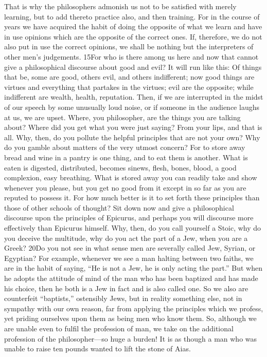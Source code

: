 That is why the philosophers admonish us not to be satisfied with merely learning, but to add thereto practice also, and then training. For in the course of years we have acquired the habit of doing the opposite of what we learn and have in use opinions which are the opposite of the correct ones. If, therefore, we do not also put in use the correct opinions, we shall be nothing but the interpreters of other men's judgements. 15For who is there among us here and now that cannot give a philosophical discourse about good and evil? It will run like this: Of things that be, some are good, others evil, and others indifferent; now good things are virtues and everything that partakes in the virtues; evil are the opposite; while indifferent are wealth, health, reputation. Then, if we are interrupted in the midst of our speech by some unusually loud noise, or if someone in the audience laughs at us, we are upset. Where, you philosopher, are the things you are talking about? Where did you get what you were just saying? From your lips, and that is all. Why, then, do you pollute the helpful principles that are not your own? Why do you gamble about matters of the very utmost concern? For to store away bread and wine in a pantry is one thing, and to eat them is another. What is eaten is digested, distributed, becomes sinews, flesh, bones, blood, a good complexion, easy breathing. What is stored away you can readily take and show whenever you please, but you get no good from it except in so far as you are reputed to possess it. For how much better is it to set forth these principles than those of other schools of thought? Sit down now and give a philosophical discourse upon the principles of Epicurus, and perhaps you will discourse more effectively than Epicurus himself. Why, then, do you call yourself a Stoic, why do you deceive the multitude, why do you act the part of a Jew, when you are a Greek? 20Do you not see in what sense men are severally called Jew, Syrian, or Egyptian? For example, whenever we see a man halting between two faiths, we are in the habit of saying, ``He is not a Jew, he is only acting the part.'' But when he adopts the attitude of mind of the man who has been baptized and has made his choice, then he both is a Jew in fact and is also called one. So we also are counterfeit ``baptists,'' ostensibly Jews, but in reality something else, not in sympathy with our own reason, far from applying the principles which we profess, yet priding ourselves upon them as being men who know them. So, although we are unable even to fulfil the profession of man, we take on the additional profession of the philosopher—so huge a burden! It is as though a man who was unable to raise ten pounds wanted to lift the stone of Aias.

